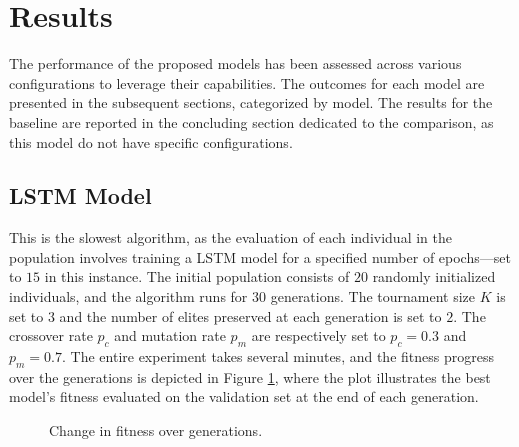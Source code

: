 \section{Results}

The performance of the proposed models has been assessed across various configurations to leverage their capabilities. The outcomes for each model are presented in the subsequent sections, categorized by model. The results for the baseline are reported in the concluding section dedicated to the comparison, as this model do not have specific configurations.

\subsection{LSTM Model}

This is the slowest algorithm, as the evaluation of each individual in the population involves training a LSTM model for a specified number of epochs—set to $15$ in this instance. The initial population consists of $20$ randomly initialized individuals, and the algorithm runs for $30$ generations. The tournament size $K$ is set to $3$ and the number of elites preserved at each generation is set to $2$. The crossover rate $p_c$ and mutation rate $p_m$ are respectively set to $p_c=0.3$ and $p_m=0.7$. The entire experiment takes several minutes, and the fitness progress over the generations is depicted in Figure \ref{fig:fitness-lstm}, where the plot illustrates the best model's fitness evaluated on the validation set at the end of each generation.

\begin{figure}[h]
\centering
\caption{Change in fitness over generations.} 
\label{fig:fitness-lstm}
\end{figure}

